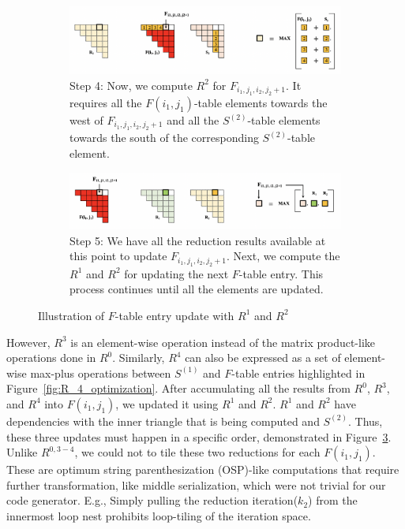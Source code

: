 \begin{figure}[htbp]
\begin{subfigure}[htbp]{1\linewidth}
\centering
\includegraphics[scale=0.35, trim=4 4 4 4,clip]{content/figures/r0_r1_4.png}
\caption{Step 4: Now, we compute $R^{2}$ for  $F_{i_1, j_1, i_2, j_2+1}$. It requires all the $F(i_1, j_1)$-table elements towards the west of $F_{i_1, j_1, i_2, j_2+1}$ and all the $S^{(2)}$-table elements towards the south of the corresponding $S^{(2)}$-table element.}
\label{fig:r3_r4_4}
\end{subfigure}

\begin{subfigure}[htbp]{1\linewidth}
\centering
\includegraphics[scale=0.35, trim=4 4 4 4,clip]{content/figures/r0_r1_5.png}
\caption{Step 5: We have all the reduction results available at this point to update $F_{i_1, j_1, i_2, j_2+1}$. Next, we compute the $R^{1}$ and $R^{2}$ for updating the next $F$-table entry. This process continues until all the elements are updated.}
\label{fig:r3_r4_5}
\end{subfigure}
\caption{Illustration of $F$-table entry update with $R^{1}$ and $R^{2}$}
\label{fig:final_ftable_update}
\end{figure}
However, $R^3$ is an element-wise operation instead of the matrix product-like operations done in $R^{0}$. Similarly, $R^{4}$ can also be expressed as a set of element-wise max-plus operations between $S^{(1)}$ and $F$-table entries highlighted in Figure~\ref{fig:R_4_optimization}. After accumulating all the results from $R^{0}$, $R^{3}$, and $R^{4}$ into $F(i_{1}, j_{1})$, we updated it using $R^{1}$ and $R^{2}$. $R^{1}$ and $R^{2}$ have dependencies with the inner triangle that is being computed and $S^{(2)}$. Thus, these three updates must happen in a specific order, demonstrated in Figure~\ref{fig:final_ftable_update}. Unlike $R^{0,3-4}$, we could not to tile these two reductions for each $F(i_{1}, j_{1})$. These are optimum string parenthesization (OSP)-like computations that require further transformation, like middle serialization, which were not trivial for our code generator. E.g., Simply pulling the reduction iteration($k_{2}$) from the innermost loop nest prohibits loop-tiling of the iteration space.

